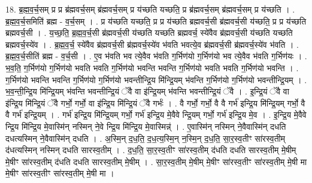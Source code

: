\documentclass[17pt]{extarticle}
\begin{document}
18. ब्र॒ह्म॒व॒र्च॒सम् प्र प्र ब्र॑ह्मवर्च॒सम् ब्र॑ह्मवर्च॒सम् प्र य॑च्छति यच्छति॒ प्र ब्र॑ह्मवर्च॒सम् ब्र॑ह्मवर्च॒सम् प्र य॑च्छति । . ब्र॒ह्म॒व॒र्च॒समिति॑ ब्रह्म - व॒र्च॒सम् । . प्र य॑च्छति यच्छति॒ प्र प्र य॑च्छति ब्रह्मवर्च॒सी ब्र॑ह्मवर्च॒सी य॑च्छति॒ प्र प्र य॑च्छति ब्रह्मवर्च॒सी । . य॒च्छ॒ति॒ ब्र॒ह्म॒व॒र्च॒सी ब्र॑ह्मवर्च॒सी य॑च्छति यच्छति ब्रह्मवर्च॒ स्ये॑वैव ब्र॑ह्मवर्च॒सी य॑च्छति यच्छति ब्रह्मवर्च॒स्ये॑व । . ब्र॒ह्म॒व॒र्च॒ स्ये॑वैव ब्र॑ह्मवर्च॒सी ब्र॑ह्मवर्च॒स्ये॑व भ॑वति भवत्ये॒व ब्र॑ह्मवर्च॒सी ब्र॑ह्मवर्च॒स्ये॑व भ॑वति । . ब्र॒ह्म॒व॒र्च॒सीति॑ ब्रह्म - व॒र्च॒सी । . ए॒व भ॑वति भव त्ये॒वैव भ॑वति ग॒र्भिण॑यो ग॒र्भिण॑यो भव त्ये॒वैव भ॑वति ग॒र्भिण॑यः । . भ॒व॒ति॒ ग॒र्भिण॑यो ग॒र्भिण॑यो भवति भवति ग॒र्भिण॑यो भवन्ति भवन्ति ग॒र्भिण॑यो भवति भवति ग॒र्भिण॑यो भवन्ति । . ग॒र्भिण॑यो भवन्ति भवन्ति ग॒र्भिण॑यो ग॒र्भिण॑यो भवन्तीन्द्रि॒य मि॑न्द्रि॒यम् भ॑वन्ति ग॒र्भिण॑यो ग॒र्भिण॑यो भवन्तीन्द्रि॒यम् । . भ॒व॒न्ती॒न्द्रि॒य मि॑न्द्रि॒यम् भ॑वन्ति भवन्तीन्द्रि॒यं ॅवै वा इ॑न्द्रि॒यम् भ॑वन्ति भवन्तीन्द्रि॒यं ॅवै । . इ॒न्द्रि॒यं ॅवै वा इ॑न्द्रि॒य मि॑न्द्रि॒यं ॅवै गर्भो॒ गर्भो॒ वा इ॑न्द्रि॒य मि॑न्द्रि॒यं ॅवै गर्भः॑ । . वै गर्भो॒ गर्भो॒ वै वै गर्भ॑ इन्द्रि॒य मि॑न्द्रि॒यम् गर्भो॒ वै वै गर्भ॑ इन्द्रि॒यम् । . गर्भ॑ इन्द्रि॒य मि॑न्द्रि॒यम् गर्भो॒ गर्भ॑ इन्द्रि॒य मे॒वैवे न्द्रि॒यम् गर्भो॒ गर्भ॑ इन्द्रि॒य मे॒व । . इ॒न्द्रि॒य मे॒वैवे न्द्रि॒य मि॑न्द्रि॒य मे॒वास्मि॑न् नस्मिन् ने॒वे न्द्रि॒य मि॑न्द्रि॒य मे॒वास्मिन्न्॑ । . ए॒वास्मि॑न् नस्मिन् ने॒वैवास्मि॑न् दधति दधत्यस्मिन् ने॒वैवास्मि॑न् दधति । . अ॒स्मि॒न् द॒ध॒ति॒ द॒ध॒त्य॒स्मि॒न् न॒स्मि॒न् द॒ध॒ति॒ सा॒र॒स्व॒तीꣳ सा॑रस्व॒तीम् द॑धत्यस्मिन् नस्मिन् दधति सारस्व॒तीम् । . द॒ध॒ति॒ सा॒र॒स्व॒तीꣳ सा॑रस्व॒तीम् द॑धति दधति सारस्व॒तीम् मे॒षीम् मे॒षीꣳ सा॑रस्व॒तीम् द॑धति दधति सारस्व॒तीम् मे॒षीम् । . सा॒र॒स्व॒तीम् मे॒षीम् मे॒षीꣳ सा॑रस्व॒तीꣳ सा॑रस्व॒तीम् मे॒षी मा मे॒षीꣳ सा॑रस्व॒तीꣳ सा॑रस्व॒तीम् मे॒षी मा । \newline
\end{document}
